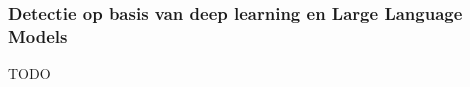 \subsubsection{Detectie op basis van deep learning en Large Language Models}
\label{subsubsec:deeplearning-en-llm-detectie}

TODO